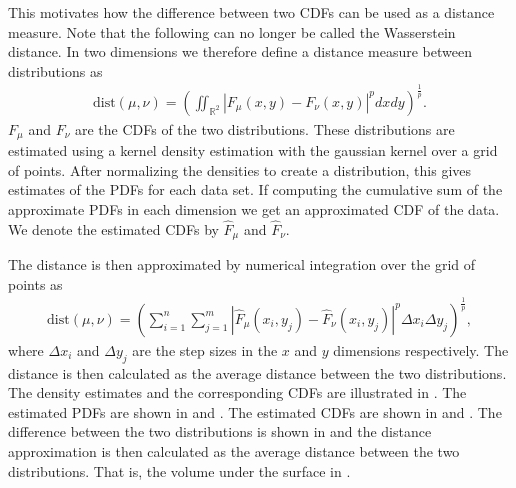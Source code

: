 This motivates how the difference between two \gls{CDF}s can be used as a distance measure. Note that the following can no longer be called the Wasserstein distance. In two dimensions we therefore define a distance measure between distributions as
\begin{align*}
    \mathrm{dist}(\mu,\nu) = \left(\iint_{\mathbb{R}^2} |F_\mu(x,y) - F_\nu(x,y)|^p dx dy \right) ^{\frac{1}{p}}.
\end{align*}
$F_\mu$ and $F_\nu$ are the \gls{CDF}s of the two distributions. These distributions are estimated using a kernel density estimation with the gaussian kernel over a grid of points. After normalizing the densities to create a distribution, this gives estimates of the \gls{PDF}s for each data set. If computing the cumulative sum of the approximate \gls{PDF}s in each dimension we get an approximated \gls{CDF} of the data. We denote the estimated \gls{CDF}s by $\hat F_\mu$ and $\hat F_\nu$. 

The distance is then approximated by numerical integration over the grid of points as
\begin{align*}
    \mathrm{dist}(\mu,\nu) = \left( \sum_{i=1}^n \sum_{j=1}^m |\hat F_\mu(x_i,y_j) - \hat F_\nu(x_i,y_j)|^p \Delta x_i \Delta y_j \right)^{\frac{1}{p}},
\end{align*}
where $\Delta x_i$ and $\Delta y_j$ are the step sizes in the $x$ and $y$ dimensions respectively. The distance is then calculated as the average distance between the two distributions. The density estimates and the corresponding CDFs are illustrated in . The estimated \gls{PDF}s are shown in  and . The estimated \gls{CDF}s are shown in  and . The difference between the two distributions is shown in  and the distance approximation is then calculated as the average distance between the two distributions. That is, the volume under the surface in . 


